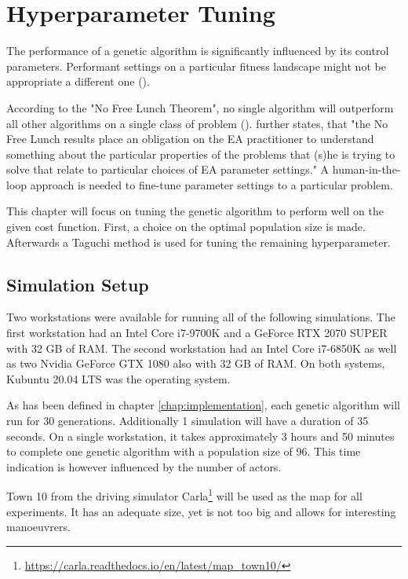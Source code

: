 \chapter{Hyperparameter Tuning}
\label{chap:hyperparameter_tuning}
The performance of a genetic algorithm is significantly influenced by its control parameters. Performant settings on a particular fitness landscape might not be appropriate a different one (\cite{kacprzyk_parameter_2007}).

According to the "No Free Lunch Theorem", no single algorithm will outperform all other algorithms on a single class of problem (\cite{kacprzyk_parameter_2007}). \cite{kacprzyk_parameter_2007} further states, that "the No Free Lunch results place an obligation on the EA practitioner to understand something about the particular properties of the problems that (s)he is trying to solve that relate to particular choices of EA parameter settings."
A human-in-the-loop approach is needed to fine-tune parameter settings to a particular problem.

This chapter will focus on tuning the genetic algorithm to perform well on the given cost function. First, a choice on the optimal population size is made. Afterwards a Taguchi method is used for tuning the remaining hyperparameter.

\section{Simulation Setup}
\label{chap:hyperparameter_tuning:simulation_setup}
Two workstations were available for running all of the following simulations. The first workstation had an Intel Core i7-9700K and a GeForce RTX 2070 SUPER with 32 GB of RAM. The second workstation had an Intel Core i7-6850K as well as two Nvidia GeForce GTX 1080 also with 32 GB of RAM. On both systems, Kubuntu 20.04 LTS was the operating system.

As has been defined in chapter \ref{chap:implementation}, each genetic algorithm will run for 30 generations. Additionally 1 simulation will have a duration of 35 seconds. On a single workstation, it takes approximately 3 hours and 50 minutes to complete one genetic algorithm with a population size of 96. This time indication is however influenced by the number of actors. 

Town 10 from the driving simulator Carla\footnote{\href{https://carla.readthedocs.io/en/latest/map_town10/}{https://carla.readthedocs.io/en/latest/map\_town10/}} will be used as the map for all experiments. It has an adequate size, yet is not too big and allows for interesting manoeuvrers.

